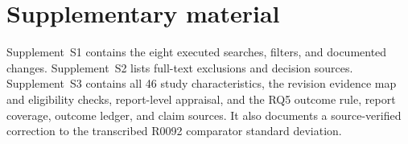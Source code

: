 \documentclass[pdflatex,sn-vancouver-num]{sn-jnl}
\begin{document}
\section*{Supplementary material}
Supplement~S1 contains the eight executed searches, filters, and documented changes. Supplement~S2 lists full-text exclusions and decision sources. Supplement~S3 contains all 46 study characteristics, the revision evidence map and eligibility checks, report-level appraisal, and the RQ5 outcome rule, report coverage, outcome ledger, and claim sources. It also documents a source-verified correction to the transcribed R0092 comparator standard deviation.


\end{document}
